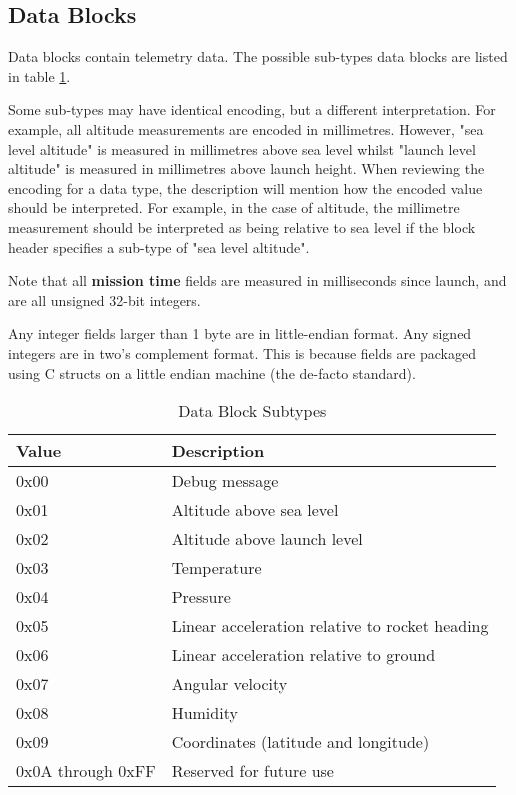 \subsection{Data Blocks}

Data blocks contain telemetry data. The possible sub-types data blocks are listed in table \ref{table:data-subtypes}.

Some sub-types may have identical encoding, but a different interpretation. For example, all altitude measurements are
encoded in millimetres. However, "sea level altitude" is measured in millimetres above sea level whilst "launch level
altitude" is measured in millimetres above launch height. When reviewing the encoding for a data type, the description
will mention how the encoded value should be interpreted. For example, in the case of altitude, the millimetre
measurement should be interpreted as being relative to sea level if the block header specifies a sub-type of "sea level
altitude".

Note that all \textbf{mission time} fields are measured in milliseconds since launch, and are all unsigned 32-bit
integers.

Any integer fields larger than 1 byte are in little-endian format. Any signed integers are in two's complement format.
This is because fields are packaged using C structs on a little endian machine (the de-facto standard).

\begin{table}[H]
    \centering
    \begin{tabular}{@{}ll@{}}
        \toprule
        Value             & Description                                    \\
        \midrule
        0x00              & Debug message                                  \\
        0x01              & Altitude above sea level                       \\
        0x02              & Altitude above launch level                    \\
        0x03              & Temperature                                    \\
        0x04              & Pressure                                       \\
        0x05              & Linear acceleration relative to rocket heading \\
        0x06              & Linear acceleration relative to ground         \\
        0x07              & Angular velocity                               \\
        0x08              & Humidity                                       \\
        0x09              & Coordinates (latitude and longitude)           \\
        0x0A through 0xFF & Reserved for future use                        \\
        \bottomrule
    \end{tabular}
    \caption{Data Block Subtypes}
    \label{table:data-subtypes}
\end{table}


